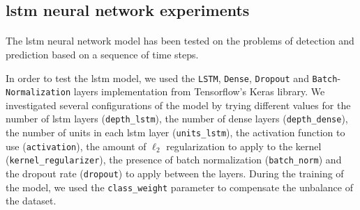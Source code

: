 \subsection{\acs{lstm} neural network experiments}
\paragraph{} The \acs{lstm} neural network model has been tested on the problems of detection and prediction based on a sequence of time steps.

In order to test the \acs{lstm} model, we used the \texttt{LSTM}, \texttt{Dense}, \texttt{Dropout} and \texttt{Batch}-\texttt{Normalization} layers implementation from Tensorflow's Keras library. We investigated several configurations of the model by trying different values for the number of \acs{lstm} layers (\texttt{depth\_lstm}), the number of dense layers (\texttt{depth\_dense}), the number of units in each \acs{lstm} layer (\texttt{units\_lstm}), the activation function to use (\texttt{activation}), the amount of $\ell_2$ regularization to apply to the kernel (\texttt{kernel\_regularizer}), the presence of batch normalization (\texttt{batch\_norm}) and the dropout rate (\texttt{dropout}) to apply between the layers. During the training of the model, we used the \texttt{class\_weight} parameter to compensate the unbalance of the dataset.


